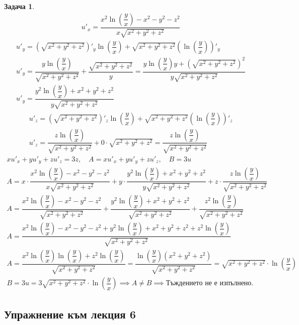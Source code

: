 \documentclass[a4paper,fleqn,12pt]{article}
\newtheorem{task}{Задача}[section]
\begin{document}
\begin{task}
\begin{gather*}
u'_x = \dfrac{x^2\ln{\left( \dfrac{y}{x}\right)} - x^2- y^2- z^2}{x\sqrt{x^2+y^2+z^2}}
\end{gather*} 
\begin{gather*}
u'_y = \left(\sqrt{x^2+y^2+z^2}\right)'_y \ln{\left( \dfrac{y}{x}\right)} + \sqrt{x^2+y^2+z^2}\left( \ln{\left( \dfrac{y}{x}\right)}\right)'_y \\
u'_y = \dfrac{y\ln{\left( \dfrac{y}{x}\right)}}{\sqrt{x^2+y^2+z^2}} + \dfrac{\sqrt{x^2+y^2+z^2}}{y} = \dfrac{y\ln{\left( \dfrac{y}{x}\right)}y + \left(\sqrt{x^2+y^2+z^2}\right)^2}{y\sqrt{x^2+y^2+z^2}}\\
u'_y = \dfrac{y^2\ln{\left( \dfrac{y}{x}\right)} + x^2 + y^2 + z^2}{y\sqrt{x^2+y^2+z^2}}
\end{gather*}
\begin{gather*}
u'_z = \left(\sqrt{x^2+y^2+z^2}\right)'_z\ln{\left( \dfrac{y}{x}\right)} + \sqrt{x^2+y^2+z^2}\left( \ln{\left( \dfrac{y}{x}\right)}\right)'_z \\
u'_z = \dfrac{z\ln{\left( \dfrac{y}{x}\right)}}{\sqrt{x^2+y^2+z^2}} + 0 \cdot \sqrt{x^2+y^2+z^2} = \dfrac{z\ln{\left( \dfrac{y}{x}\right)}}{\sqrt{x^2+y^2+z^2}}
\end{gather*}
\begin{gather*}
xu'_x + yu'_y + zu'_z = 3z , \quad A = xu'_x + yu'_y + zu'_z, \quad B = 3u\\
A = x \cdot \dfrac{x^2\ln{\left( \dfrac{y}{x}\right)} - x^2- y^2- z^2}{x\sqrt{x^2+y^2+z^2}} + y \cdot \dfrac{y^2\ln{\left( \dfrac{y}{x}\right)} + x^2 + y^2 + z^2}{y\sqrt{x^2+y^2+z^2}} + z \cdot \dfrac{z\ln{\left( \dfrac{y}{x}\right)}}{\sqrt{x^2+y^2+z^2}}\\
A = \dfrac{x^2\ln{\left( \dfrac{y}{x}\right)} - x^2- y^2- z^2}{\sqrt{x^2+y^2+z^2}} + \dfrac{y^2\ln{\left( \dfrac{y}{x}\right)} + x^2 + y^2 + z^2}{\sqrt{x^2+y^2+z^2}} + \dfrac{z^2\ln{\left( \dfrac{y}{x}\right)}}{\sqrt{x^2+y^2+z^2}}\\
A = \dfrac{x^2\ln{\left( \dfrac{y}{x}\right)} - x^2- y^2- z^2 + y^2\ln{\left( \dfrac{y}{x}\right)} + x^2 + y^2 + z^2 +z^2\ln{\left(\dfrac{y}{x}\right)}}{\sqrt{x^2+y^2+z^2}} \\
A = \dfrac{x^2\ln{\left( \dfrac{y}{x}\right)} \ln{\left( \dfrac{y}{x}\right)} + z^2\ln{\left(\dfrac{y}{x}\right)}}{\sqrt{x^2+y^2+z^2}} = \dfrac{\ln{\left( \dfrac{y}{x}\right)} (x^2 +y^2 + z^2)}{\sqrt{x^2+y^2+z^2}} = \sqrt{x^2+y^2+z^2}\cdot \ln{\left( \dfrac{y}{x}\right)}\\
B = 3u = 3\sqrt{x^2+y^2+z^2}\cdot \ln{\left( \dfrac{y}{x}\right)} \implies
A \neq B \implies \text{Тъждението не е изпълнено.}
\end{gather*}
\end{task}
\newpage
\subsection{Упражнение към лекция 6}
\end{document}
